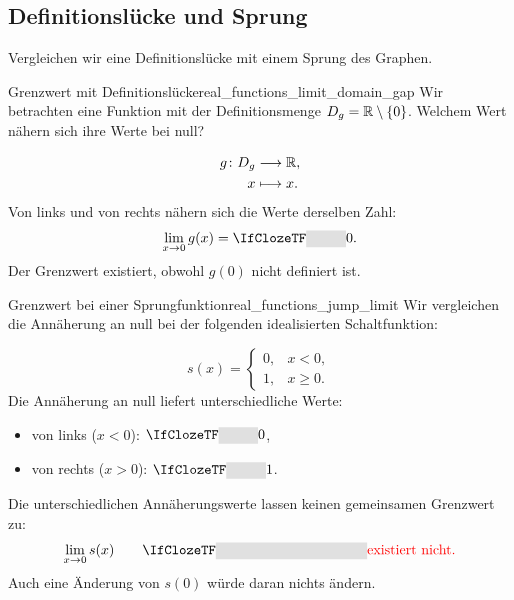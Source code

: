 \subsection{Definitionslücke und Sprung}
\label{subsec:real_functions_one_sided_limits}
Vergleichen wir eine Definitionslücke mit einem Sprung des Graphen.
\begin{ExampleBox}{Grenzwert mit Definitionslücke}{real_functions_limit_domain_gap}
  Wir betrachten eine Funktion mit der Definitionsmenge
  $D_g=\mathbb{R}\setminus\{0\}$. Welchem Wert nähern sich ihre Werte bei null?
  \par\smallskip\noindent
  \begin{minipage}[c]{0.48\linewidth}
    \[
      \begin{aligned}
        g\colon D_g&\longrightarrow\mathbb{R},\\
        x&\longmapsto x.
      \end{aligned}
    \]
    Von links und von rechts nähern sich die Werte derselben Zahl:
    \[
      \lim_{x\to0}g(x)=\Cloze{1cm}{0}.
    \]
    Der Grenzwert existiert, obwohl $g(0)$ nicht definiert ist.
  \end{minipage}\hfill
  \begin{minipage}[c]{0.47\linewidth}
    \centering
  \end{minipage}
\end{ExampleBox}
\begin{ExampleBox}{Grenzwert bei einer Sprungfunktion}{real_functions_jump_limit}
  Wir vergleichen die Annäherung an null bei der folgenden idealisierten
  Schaltfunktion:
  \par\smallskip
  \begin{minipage}[c]{0.47\linewidth}
    \[
      s(x)=\begin{cases}0,&x<0,\\1,&x\ge0.\end{cases}
    \]
    Die Annäherung an null liefert unterschiedliche Werte:
    \begin{itemize}
      \item von links ($x<0$): $\Cloze{1cm}{0}$,
      \item von rechts ($x>0$): $\Cloze{1cm}{1}$.
    \end{itemize}
  \end{minipage}\hfill
  \begin{minipage}[c]{0.49\linewidth}
    \centering
  \end{minipage}
  \par\medskip
  Die unterschiedlichen Annäherungswerte lassen keinen gemeinsamen
  Grenzwert zu:
  \[
    \lim_{x\to0}s(x)\qquad
    \Cloze{3.8cm}{\textcolor{red}{\text{existiert nicht.}}}
  \]
  Auch eine Änderung von $s(0)$ würde daran nichts ändern.
\end{ExampleBox}
